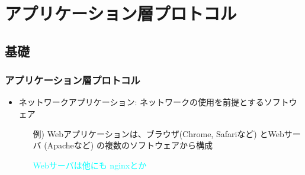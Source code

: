 \section{アプリケーション層プロトコル}

\subsection{基礎}
\subsubsection{アプリケーション層プロトコル}

\begin{itemize}
  \item ネットワークアプリケーション: ネットワークの使用を前提とするソフトウェア
  \begin{itemize}
    \item[例)] Webアプリケーションは、ブラウザ(Chrome, Safariなど) とWebサーバ (Apacheなど) の複数のソフトウェアから構成
    \item[] \textcolor{cyan}{Webサーバは他にも nginxとか}
  \end{itemize}
\end{itemize}

